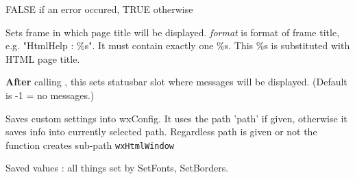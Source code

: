 
FALSE if an error occured, TRUE otherwise

\label{wxhtmlwindowsetrelatedframe}


Sets frame in which page title will be displayed. {\it format} is format of
frame title, e.g. "HtmlHelp : \%s". It must contain exactly one \%s. This
\%s is substituted with HTML page title.

\label{wxhtmlwindowsetrelatedstatusbar}


{\bf After} calling ,
this sets statusbar slot where messages will be displayed.
(Default is -1 = no messages.)



\label{wxhtmlwindowwritecustomization}


Saves custom settings into wxConfig. It uses the path 'path'
if given, otherwise it saves info into currently selected path.
Regardless path is given or not the function creates sub-path 
{\tt wxHtmlWindow}

Saved values : all things set by SetFonts, SetBorders.





